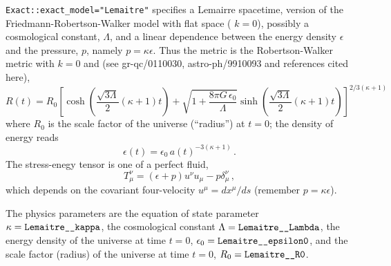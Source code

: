 \verb|Exact::exact_model="Lemaitre"| specifies a Lemairre spacetime,
version of the Friedmann-Robertson-Walker model with flat space
(\ie{} $k=0$), possibly a cosmological constant, $\Lambda$, and a
linear dependence between the energy density $\epsilon$ and the
pressure, $p$, namely $p=\kappa \epsilon$. Thus the metric is the
Robertson-Walker metric
with $k =0$ and (see gr-qc/0110030, astro-ph/9910093 and references
cited here),
\begin{equation}
R(t) = R_0 \left[ \cosh \left(\frac{\sqrt{3\Lambda}}{2}(\kappa+1) t \right)
		  +
		  \sqrt{1+\frac{8\pi G\,\epsilon_{0}}{\Lambda}}
		  \sinh \left( \frac{\sqrt{3\Lambda}}{2}(\kappa+1) t \right)
		  \right]^{2/3(\kappa+1)}   
\end{equation}
where $R_0$ is the scale factor of the universe (``radius'') at $t=0$;
the density of energy reads
\begin{equation}\label{dens}
\epsilon(t)=\epsilon_0\,a(t)^{-3(\kappa+1)}\,.
\end{equation}
The stress-enegy tensor is one of a perfect fluid,
\begin{equation}
T_{\mu}^{\nu}=(\epsilon+p)u^{\nu}u_{\mu}-p \delta_{\mu}^{\nu}\,, 
\end{equation}
which depends on the covariant four-velocity  $u^{\mu}=dx^{\mu}/ds$
(remember $p=\kappa \epsilon$).

The physics parameters are
the equation of state parameter $\kappa = \verb|Lemaitre__kappa|$,
the cosmological constant $\Lambda = \verb|Lemaitre__Lambda|$,
the energy density of the universe at time $t = 0$,
$\epsilon_0 = \verb|Lemaitre__epsilon0|$,
and the scale factor (radius) of the universe at time $t = 0$,
$R_0 = \verb|Lemaitre__R0|$.

